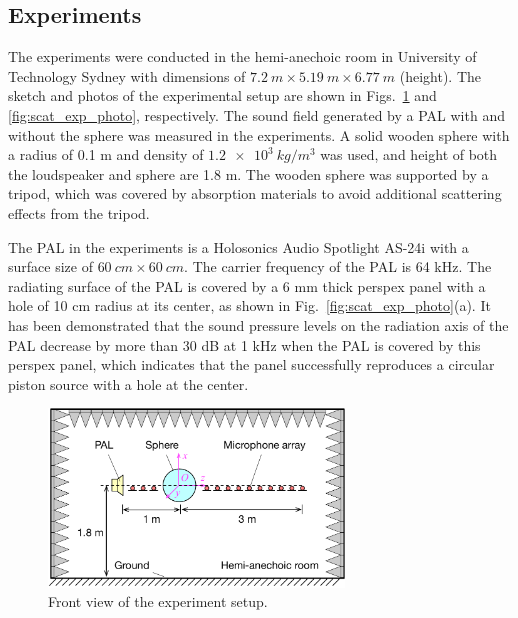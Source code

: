 \subsection{Experiments}

The experiments were conducted in the hemi-anechoic room in University of Technology Sydney with dimensions of $\SI{7.2}{m} \times \SI{ 5.19}{ m} \times\SI{ 6.77 }{m}$ (height). 
The sketch and photos of the experimental setup are shown in Figs.~\ref{fig:scat_exp_sketch} and \ref{fig:scat_exp_photo}, respectively. 
The sound field generated by a PAL with and without the sphere was measured in the experiments. 
A solid wooden sphere with a radius of 0.1 m and density of $\SI{1.2e3}{kg/m^3}$ was used, and height of both the loudspeaker and sphere are 1.8 m.
 The wooden sphere was supported by a tripod, which was covered by absorption materials to avoid additional scattering effects from the tripod.

The PAL in the experiments is a Holosonics Audio Spotlight AS-24i with a surface size of $\SI{60 }{cm}\times \SI{60}{cm}$. 
The carrier frequency of the PAL is 64 kHz. 
The radiating surface of the PAL is covered by a 6 mm thick perspex panel with a hole of 10 cm radius at its center, as shown in Fig.~\ref{fig:scat_exp_photo}(a). 
It has been demonstrated that the sound pressure levels on the radiation axis of the PAL decrease by more than 30 dB at 1 kHz when the PAL is covered by this perspex panel, which indicates that the panel successfully reproduces a circular piston source with a hole at the center.

\begin{figure}[!htb]
    \centering
    \includegraphics[width = 0.7\textwidth]{fig/ExperimentSetup_v2}
    \caption{ Front view of the experiment setup.}
    \label{fig:scat_exp_sketch}
\end{figure}

